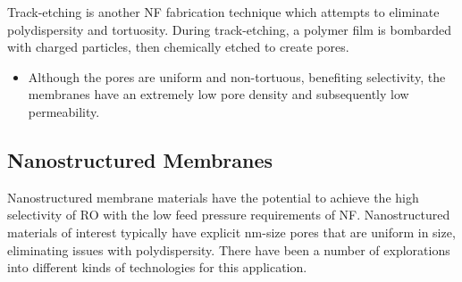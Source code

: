   Track-etching is another NF fabrication technique which attempts to eliminate 
  polydispersity and tortuosity. During track-etching, a polymer film is bombarded with 
  charged particles, then chemically etched to create pores.~\cite{apel_track_2001}
  \begin{itemize}
	\item Although the pores are uniform and non-tortuous, benefiting selectivity, the 
	membranes have an extremely low pore density and subsequently low permeability. 
  \end{itemize}
  
  \subsection{Nanostructured Membranes}
  
  Nanostructured membrane materials have the potential to achieve the high selectivity
  of RO with the low feed pressure requirements of NF. Nanostructured materials of 
  interest typically have explicit nm-size pores that are uniform in size, eliminating
  issues with polydispersity. There have been a number of explorations into different
  kinds of technologies for this application.
  
  
